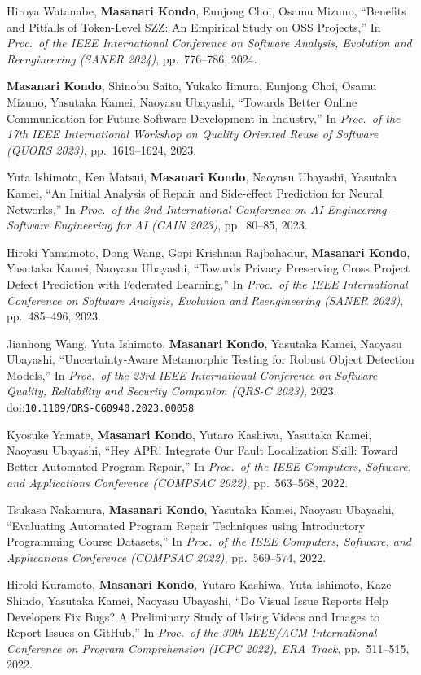 \documentclass[10pt,a4paper]{article}
\newcommand{\me}{\textbf{Masanari Kondo}}
\begin{document}
\begin{publist}[label={[C\arabic*]}]
  \item Hiroya Watanabe, \me, Eunjong Choi, Osamu Mizuno, ``Benefits and Pitfalls of Token-Level SZZ: An Empirical Study on OSS Projects,'' In \textit{Proc.\ of the IEEE International Conference on Software Analysis, Evolution and Reengineering (SANER 2024)}, pp.\ 776--786, 2024.
  \item \me, Shinobu Saito, Yukako Iimura, Eunjong Choi, Osamu Mizuno, Yasutaka Kamei, Naoyasu Ubayashi, ``Towards Better Online Communication for Future Software Development in Industry,'' In \textit{Proc.\ of the 17th IEEE International Workshop on Quality Oriented Reuse of Software (QUORS 2023)}, pp.\ 1619--1624, 2023.
  \item Yuta Ishimoto, Ken Matsui, \me, Naoyasu Ubayashi, Yasutaka Kamei, ``An Initial Analysis of Repair and Side-effect Prediction for Neural Networks,'' In \textit{Proc.\ of the 2nd International Conference on AI Engineering -- Software Engineering for AI (CAIN 2023)}, pp.\ 80--85, 2023.
  \item Hiroki Yamamoto, Dong Wang, Gopi Krishnan Rajbahadur, \me, Yasutaka Kamei, Naoyasu Ubayashi, ``Towards Privacy Preserving Cross Project Defect Prediction with Federated Learning,'' In \textit{Proc.\ of the IEEE International Conference on Software Analysis, Evolution and Reengineering (SANER 2023)}, pp.\ 485--496, 2023.
  \item Jianhong Wang, Yuta Ishimoto, \me, Yasutaka Kamei, Naoyasu Ubayashi, ``Uncertainty-Aware Metamorphic Testing for Robust Object Detection Models,'' In \textit{Proc.\ of the 23rd IEEE International Conference on Software Quality, Reliability and Security Companion (QRS-C 2023)}, 2023. doi:\nolinkurl{10.1109/QRS-C60940.2023.00058}
  \item Kyosuke Yamate, \me, Yutaro Kashiwa, Yasutaka Kamei, Naoyasu Ubayashi, ``Hey APR! Integrate Our Fault Localization Skill: Toward Better Automated Program Repair,'' In \textit{Proc.\ of the IEEE Computers, Software, and Applications Conference (COMPSAC 2022)}, pp.\ 563--568, 2022.
  \item Tsukasa Nakamura, \me, Yasutaka Kamei, Naoyasu Ubayashi, ``Evaluating Automated Program Repair Techniques using Introductory Programming Course Datasets,'' In \textit{Proc.\ of the IEEE Computers, Software, and Applications Conference (COMPSAC 2022)}, pp.\ 569--574, 2022.
  \item Hiroki Kuramoto, \me, Yutaro Kashiwa, Yuta Ishimoto, Kaze Shindo, Yasutaka Kamei, Naoyasu Ubayashi, ``Do Visual Issue Reports Help Developers Fix Bugs? A Preliminary Study of Using Videos and Images to Report Issues on GitHub,'' In \textit{Proc.\ of the 30th IEEE/ACM International Conference on Program Comprehension (ICPC 2022), ERA Track}, pp.\ 511--515, 2022.

\end{publist}
\end{document}
